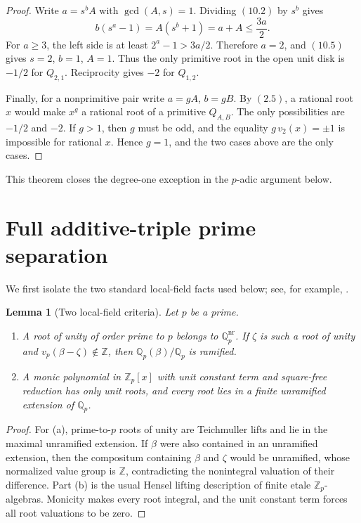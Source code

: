 \documentclass[11pt]{article}
\newtheorem{lemma}[theorem]{Lemma}
\theoremstyle{definition}
\newcommand{\Q}{\mathbb Q}
\newcommand{\Z}{\mathbb Z}
\begin{document}
\begin{proof}
Write \(a=s^bA\) with \(\gcd(A,s)=1\).  Dividing \((10.2)\) by \(s^b\)
gives
\begin{equation}
 b(s^a-1)=A(s^b+1)=a+A\leq\frac{3a}{2}.
 \tag{10.6}
\end{equation}
For \(a\geq3\), the left side is at least \(2^a-1>3a/2\).  Therefore
\(a=2\), and \((10.5)\) gives \(s=2\), \(b=1\), \(A=1\).  Thus the only
primitive root in the open unit disk is \(-1/2\) for \(Q_{2,1}\).  Reciprocity
gives \(-2\) for \(Q_{1,2}\).

Finally, for a nonprimitive pair write \(a=gA\), \(b=gB\).  By \((2.5)\), a
rational root \(x\) would make \(x^g\) a rational root of a primitive
\(Q_{A,B}\).  The only possibilities are \(-1/2\) and \(-2\).  If \(g>1\), then \(g\)
must be odd, and the equality \(g\,v_2(x)=\pm1\) is impossible for rational
\(x\).  Hence \(g=1\), and the two cases above are the only cases.
\end{proof}

This theorem closes the degree-one exception in the \(p\)-adic argument below.

\section{Full additive-triple prime separation}
\label{sec:padic}

We first isolate the two standard local-field facts used below; see, for
example, \cite[Chapters~I--II]{SerreLocalFields}.

\begin{lemma}[Two local-field criteria]\label{lem:localcriteria}
Let \(p\) be a prime.
\begin{enumerate}[label=(\alph*)]
\item A root of unity of order prime to \(p\) belongs to
\(\Q_p^{\mathrm{nr}}\).  If \(\zeta\) is such a root of unity and
\(v_p(\beta-\zeta)\notin\Z\), then \(\Q_p(\beta)/\Q_p\) is ramified.
\item A monic polynomial in \(\Z_p[x]\) with unit constant term and
square-free reduction has only unit roots, and every root lies in a finite
unramified extension of \(\Q_p\).
\end{enumerate}
\end{lemma}

\begin{proof}
For (a), prime-to-\(p\) roots of unity are Teichmuller lifts and lie in the
maximal unramified extension.  If \(\beta\) were also contained in an
unramified extension, then the compositum containing \(\beta\) and \(\zeta\)
would be unramified, whose normalized value group is \(\Z\), contradicting
the nonintegral valuation of their difference.  Part (b) is the usual Hensel
lifting description of finite etale \(\Z_p\)-algebras.  Monicity makes every
root integral, and the unit constant term forces all root valuations to be
zero.
\end{proof}
\end{document}
